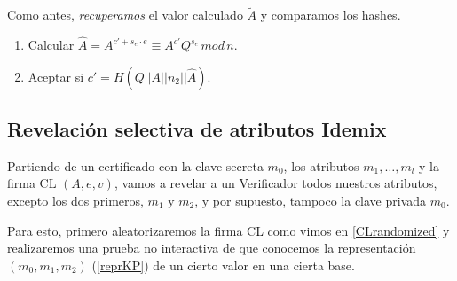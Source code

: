 \hfil

Como antes, \textit{recuperamos} el valor calculado $\tilde{A}$ y comparamos los hashes.

\begin{algorithm}[Verificar $P_2 := (s_e, c')(n_2)$]
	\hfil
	
	\begin{enumerate}
		\item Calcular $\hat{A} = A^{c'+s_e\cdot e} \equiv A^{c'}Q^{s_e} \, mod \, n$.
		\item Aceptar si $c' = H(Q||A||n_2||\hat{A})$.
	\end{enumerate}
	
\end{algorithm}



\subsection{Revelación selectiva de atributos Idemix}

Partiendo de un certificado con la clave secreta $m_0$, los atributos $m_1,\dots,m_l$ y la firma CL $(A,e,v)$, vamos a revelar a un Verificador todos nuestros atributos, excepto los dos primeros, $m_1$ y $m_2$, y por supuesto, tampoco la clave privada $m_0$.

Para esto, primero aleatorizaremos la firma CL como vimos en \ref{CLrandomized} y realizaremos una prueba no interactiva de que conocemos la representación $(m_0,m_1,m_2)$ (\ref{reprKP}) de un cierto valor en una cierta base.


